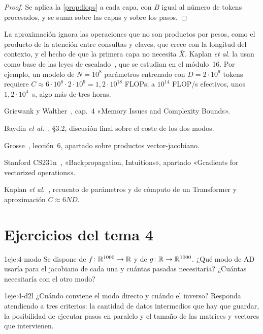 \begin{proof}
Se aplica la \cref{prop:flops} a cada capa, con $B$ igual al número de tokens procesados, y se suma sobre las capas y sobre los pasos.
\end{proof}

La aproximación ignora las operaciones que no son productos por pesos, como el producto de la atención entre consultas y claves, que crece con la longitud del contexto, y el hecho de que la primera capa no necesita $\bar X$. Kaplan \emph{et al.} la usan como base de las leyes de escalado~\cite{kaplan}, que se estudian en el módulo~16. Por ejemplo, un modelo de $N=10^{8}$ parámetros entrenado con $D=2\cdot 10^{9}$ tokens requiere $C\approx 6\cdot 10^{8}\cdot 2\cdot 10^{9}=1{,}2\cdot 10^{18}$ FLOPs; a $10^{14}$ FLOP/s efectivos, unos $1{,}2\cdot 10^{4}$~s, algo más de tres horas.

\begin{lecturas}
\item Griewank y Walther~\cite{gw}, cap.~4 «Memory Issues and Complexity Bounds».
\item Baydin \emph{et al.}~\cite{baydin}, §3.2, discusión final sobre el coste de los dos modos.
\item Grosse~\cite{grosse}, lección~6, apartado sobre productos vector-jacobiano.
\item Stanford CS231n~\cite{cs231n}, «Backpropagation, Intuitions», apartado «Gradients for vectorized operations».
\item Kaplan \emph{et al.}~\cite{kaplan}, recuento de parámetros y de cómputo de un Transformer y aproximación $C\approx 6ND$.
\end{lecturas}

\section*{Ejercicios del tema 4}

\begin{ejercicio}{1}{eje:4-modo}
Se dispone de $f\colon\mathbb{R}^{1000}\to\mathbb{R}$ y de $g\colon\mathbb{R}\to\mathbb{R}^{1000}$. ¿Qué modo de AD usaría para el jacobiano de cada una y cuántas pasadas necesitaría? ¿Cuántas necesitaría con el otro modo?
\end{ejercicio}

\begin{ejercicio}{1}{eje:4-d2l}
¿Cuándo conviene el modo directo y cuándo el inverso? Responda atendiendo a tres criterios: la cantidad de datos intermedios que hay que guardar, la posibilidad de ejecutar pasos en paralelo y el tamaño de las matrices y vectores que intervienen.
\end{ejercicio}

